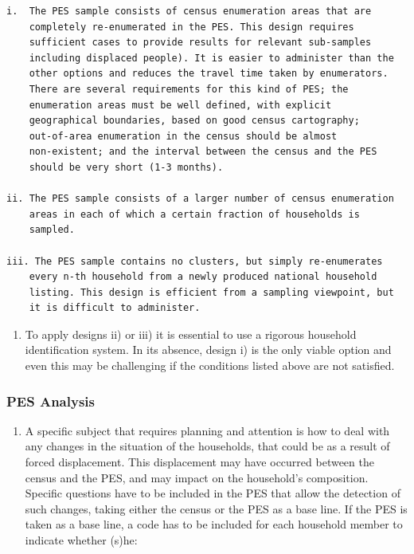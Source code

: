 \documentclass[
]{article}
\providecommand{\tightlist}{%
  \setlength{\itemsep}{0pt}\setlength{\parskip}{0pt}}
\begin{document}
\begin{verbatim}
i.  The PES sample consists of census enumeration areas that are
    completely re-enumerated in the PES. This design requires
    sufficient cases to provide results for relevant sub-samples
    including displaced people). It is easier to administer than the
    other options and reduces the travel time taken by enumerators.
    There are several requirements for this kind of PES; the
    enumeration areas must be well defined, with explicit
    geographical boundaries, based on good census cartography;
    out-of-area enumeration in the census should be almost
    non-existent; and the interval between the census and the PES
    should be very short (1-3 months).

ii. The PES sample consists of a larger number of census enumeration
    areas in each of which a certain fraction of households is
    sampled.

iii. The PES sample contains no clusters, but simply re-enumerates
    every n-th household from a newly produced national household
    listing. This design is efficient from a sampling viewpoint, but
    it is difficult to administer.
\end{verbatim}

\begin{enumerate}
\def\labelenumi{\arabic{enumi}.}
\setcounter{enumi}{113}
\tightlist
\item
  To apply designs ii) or iii) it is essential to use a rigorous
  household identification system. In its absence, design i) is the
  only viable option and even this may be challenging if the
  conditions listed above are not satisfied.
\end{enumerate}

\hypertarget{a.3.-pes-analysis}{%
\subsubsection{PES Analysis}\label{a.3.-pes-analysis}}

\begin{enumerate}
\def\labelenumi{\arabic{enumi}.}
\setcounter{enumi}{114}
\tightlist
\item
  A specific subject that requires planning and attention is how to
  deal with any changes in the situation of the households, that could
  be as a result of forced displacement. This displacement may have
  occurred between the census and the PES, and may impact on the
  household's composition. Specific questions have to be included in
  the PES that allow the detection of such changes, taking either the
  census or the PES as a base line. If the PES is taken as a base
  line, a code has to be included for each household member to
  indicate whether (s)he:
\end{enumerate}
\end{document}
